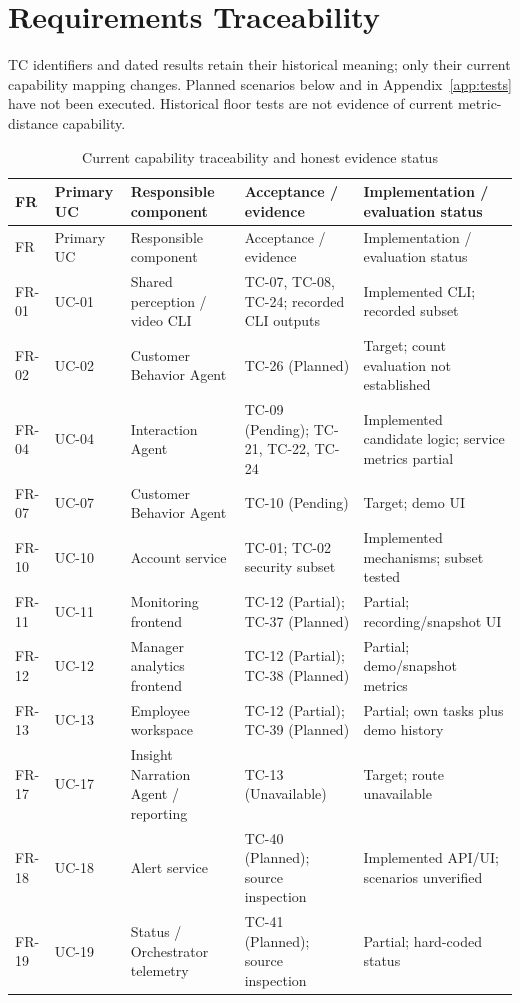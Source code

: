 \section{Requirements Traceability}
TC identifiers and dated results retain their historical meaning; only their current capability mapping changes. Planned scenarios below and in Appendix~\ref{app:tests} have not been executed. Historical floor tests are not evidence of current metric-distance capability.
\begin{longtable}{P{0.08\textwidth}P{0.09\textwidth}P{0.23\textwidth}P{0.25\textwidth}P{0.25\textwidth}}
\caption{Current capability traceability and honest evidence status}\label{tab:traceability}\\
\toprule
FR & Primary UC & Responsible component & Acceptance / evidence & Implementation / evaluation status\\
\midrule
\endfirsthead
\toprule
FR & Primary UC & Responsible component & Acceptance / evidence & Implementation / evaluation status\\
\midrule
\endhead
FR-01 & UC-01 & Shared perception / video CLI & TC-07, TC-08, TC-24; recorded CLI outputs & Implemented CLI; recorded subset\\
FR-02 & UC-02 & Customer Behavior Agent & TC-26 (Planned) & Target; count evaluation not established\\
FR-04 & UC-04 & Interaction Agent & TC-09 (Pending); TC-21, TC-22, TC-24 & Implemented candidate logic; service metrics partial\\
FR-07 & UC-07 & Customer Behavior Agent & TC-10 (Pending) & Target; demo UI\\
FR-10 & UC-10 & Account service & TC-01; TC-02 security subset & Implemented mechanisms; subset tested\\
FR-11 & UC-11 & Monitoring frontend & TC-12 (Partial); TC-37 (Planned) & Partial; recording/snapshot UI\\
FR-12 & UC-12 & Manager analytics frontend & TC-12 (Partial); TC-38 (Planned) & Partial; demo/snapshot metrics\\
FR-13 & UC-13 & Employee workspace & TC-12 (Partial); TC-39 (Planned) & Partial; own tasks plus demo history\\
FR-17 & UC-17 & Insight Narration Agent / reporting & TC-13 (Unavailable) & Target; route unavailable\\
FR-18 & UC-18 & Alert service & TC-40 (Planned); source inspection & Implemented API/UI; scenarios unverified\\
FR-19 & UC-19 & Status / Orchestrator telemetry & TC-41 (Planned); source inspection & Partial; hard-coded status\\

\end{longtable}

